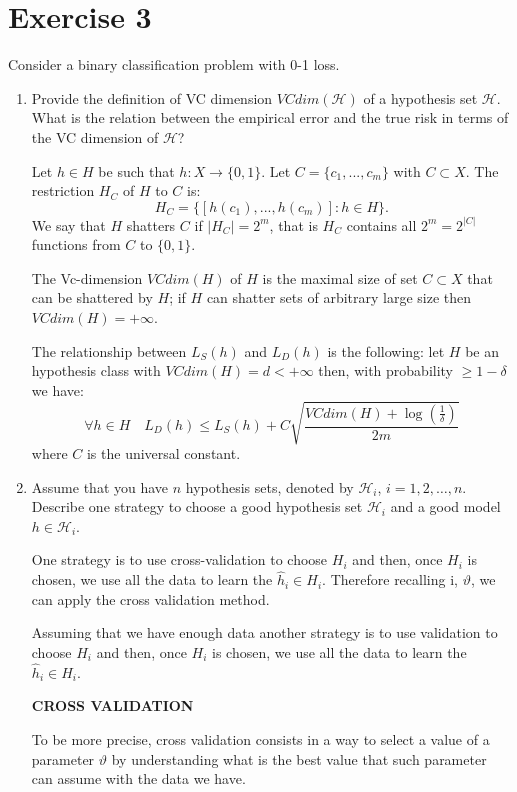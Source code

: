 \documentclass[a4paper,11pt,oneside]{book}
\begin{document}
\clearpage
\section{Exercise 3}
Consider a binary classification problem with 0-1 loss.

\begin{enumerate}
\item Provide the definition of VC dimension $VCdim(\mathcal{H})$ of a hypothesis set $\mathcal{H}$. What is the relation between the empirical error and the true risk in terms of the VC dimension of $\mathcal{H}$?
\begin{solution}
    Let $h \in H$ be such that $h : X \to \{0,1\}$. Let $C = \{c_1, ..., c_m\}$ with $C \subset X$. The restriction $H_C$ of $H$ to $C$ is:
    $$H_C = \{[h(c_1), ..., h(c_m)]: h \in H \}\text{.}$$ 
    We say that $H$ shatters $C$ if $|H_C| = 2^m$, that is $H_C$ contains all $2^m = 2^{|C|}$ functions from $C$ to $\{0,1\}$.
    
    The Vc-dimension $VCdim(H)$ of $H$ is the maximal size of set $C \subset X$ that can be shattered by $H$; if $H$ can shatter sets of arbitrary large size then $VCdim(H) = +\infty$.
    
    The relationship between $L_S(h)$ and $L_D(h)$ is the following: let $H$ be an hypothesis class with $VCdim(H) = d < +\infty$ then, with probability $\geq 1-\delta$ we have:
    $$\forall h \in H \quad L_D(h) \leq L_S(h) + C\sqrt{\frac{VCdim(H)+\log(\frac{1}{\delta})}{2m}}$$ 
    where $C$ is the universal constant.
\end{solution}

\clearpage
\item Assume that you have $n$ hypothesis sets, denoted by $\mathcal{H}_i$, $i = 1,2,\ldots,n$. Describe one strategy to choose a good hypothesis set $\mathcal{H}_i$ and a good model $h \in \mathcal{H}_i$.
\begin{solution}
    One strategy is to use cross-validation to choose $H_i$ and then, once $H_i$ is chosen, we use all the data to learn the $\hat{h}_i \in H_i$. Therefore recalling i, $\vartheta$, we can apply the cross validation method.
    
    Assuming that we have enough data another strategy is to use validation to choose $H_i$ and then, once $H_i$ is chosen, we use all the data to learn the $\hat{h}_i \in H_i$.
    
    \textbf{CROSS VALIDATION}
    
    To be more precise, cross validation consists in a way to select a value of a parameter $\vartheta$ by understanding what is the best value that such parameter can assume with the data we have.
    

\end{solution}
\end{enumerate}
\end{document}
